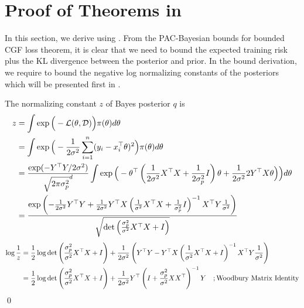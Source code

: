 \section{Proof of Theorems in \MakeLowercase{}}
\label{app:pac_bounds_proof_robust_posterior}

In this section, we derive  using . From the PAC-Bayesian bounds for bounded CGF loss theorem, it is clear that we need to bound the expected training risk plus the KL divergence between the posterior and prior. In the bound derivation, we require to bound the negative log normalizing constants of the posteriors which will be presented first in . %

\begin{lemma} 
The normalizing constant $z$ of Bayes posterior $q$ is 
\begin{align*}
    {z} &= \int \exp\Big( -\mathcal{L}(\theta, \mathcal{D}) \Big) \pi(\theta) d\theta \\
    &= \int \exp\Big( -\frac{1}{2\sigma^2}\sum_{i=1}^n (y_i - x_i^\top \theta)^2 \Big) \pi(\theta) d\theta \\
    &= \frac{\exp(-Y^\top Y/2\sigma^2)}{\sqrt{2\pi\sigma^2_p}^d}\int \exp\Big( -\theta^\top \left( \frac{1}{2\sigma^2}X^\top X + \frac{1}{2\sigma^2_p}I \right) \theta + \frac{1}{2\sigma^2}2 Y^\top X \theta \Big) \Big)  d\theta  \\
    &= \frac{\exp \left( -\frac{1}{2\sigma^2}Y^\top Y + \frac{1}{2\sigma^2}Y^\top X \left( \frac{1}{\sigma^2}X^\top X + \frac{1}{\sigma^2_p}I \right)^{-1} X^\top Y\frac{1}{\sigma^2} \right)}{\sqrt{ \det \left( \frac{\sigma_p^2}{\sigma^2} X^\top X +  I\right)}}
\end{align*}
\begin{align*}
     \log \frac{1}{z} &= \frac{1}{2}\log \det \left( \frac{\sigma_p^2}{\sigma^2} X^\top X + I \right) + \frac{1}{2\sigma^2} \left( Y^\top Y - Y^\top X \left( \frac{1}{\sigma^2} X^\top X + I \right)^{-1} X^\top Y\frac{1}{\sigma^2} \right)  \\
    &=   \frac{1}{2}\log  \det \left( \frac{\sigma_p^2}{\sigma^2} X^\top X + I \right) + \frac{1}{2\sigma^2} Y^\top \left( I + \frac{\sigma_p^2}{\sigma^2}  XX^\top  \right)^{-1} Y \quad; \text{Woodbury Matrix Identity}
\end{align*}
\qed
\label{lm:neg_log_z_bayes}
\end{lemma}


